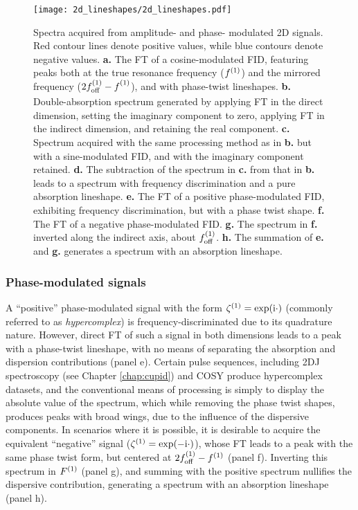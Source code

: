 \begin{figure}
    \centering
    \texttt{[image: 2d\_lineshapes/2d\_lineshapes.pdf]}
    \caption[
        Spectra acquired from amplitude- and phase-modulated \acs{2D} signals.
    ]{
        Spectra acquired from amplitude- and phase- modulated \acs{2D} signals.
        Red contour lines denote positive values, while blue contours denote
        negative values.
        \textbf{a.} The \ac{FT} of a cosine-modulated \ac{FID}, featuring peaks
        both at the true resonance frequency ($f^{(1)}$) and the mirrored
        frequency ($2f_{\mathrm{off}}^{(1)} - f^{(1)}_{\vphantom{off}}$), and with phase-twist lineshapes.
        \textbf{b.} Double-absorption spectrum generated by applying \ac{FT}
        in the direct dimension, setting the imaginary component to zero,
        applying \ac{FT} in the indirect dimension, and retaining the real
        component.
        \textbf{c.} Spectrum acquired with the same processing method as in
        \textbf{b.} but with a sine-modulated \ac{FID}, and with the imaginary
        component retained.
        \textbf{d.} The subtraction of the spectrum in \textbf{c.} from that in
        \textbf{b.} leads to a spectrum with frequency discrimination and a
        pure absorption lineshape.
        \textbf{e.} The \ac{FT} of a positive phase-modulated \ac{FID},
        exhibiting frequency discrimination, but with a phase twist shape.
        \textbf{f.} The \ac{FT} of a negative phase-modulated \ac{FID}.
        \textbf{g.} The spectrum in \textbf{f.} inverted along the indirect
        axis, about $f_{\mathrm{off}}^{(1)}$.
        \textbf{h.} The summation of \textbf{e.} and \textbf{g.} generates a
        spectrum with an absorption lineshape.
    }
    \label{fig:2d-lineshapes}
\end{figure}

\subsubsection{Phase-modulated signals}

A ``positive'' phase-modulated signal with the form $\zeta^{(1)} = \exp(\mathrm{i} \cdot)$
(commonly referred to as \emph{hypercomplex}) is frequency-discriminated due to
its quadrature nature. However, direct \ac{FT} of such a signal in both
dimensions leads to a peak with a phase-twist lineshape, with no means of
separating the absorption and dispersion contributions (panel e). Certain pulse
sequences, including \ac{2DJ} spectroscopy\cite{Aue1976,Morris2009} (see
Chapter \ref{chap:cupid}) and
\ac{COSY}\cite{Jeener1971,Jeener2016,Aue1976a} produce hypercomplex datasets,
and the conventional means of processing is simply to display the absolute
value of the spectrum, which while removing the phase twist shapes, produces
peaks with broad wings, due to the influence of the dispersive components. In
scenarios where it is possible, it is desirable to acquire the equivalent
``negative'' signal ($\zeta^{(1)} = \exp(-\mathrm{i} \cdot)$), whose \ac{FT} leads to
a peak with the same phase twist form, but centered at $2f_{\mathrm{off}}^{(1)} - f^{(1)}$
(panel f). Inverting this spectrum in $F^{(1)}$ (panel g), and summing with the
positive spectrum nullifies the dispersive contribution, generating a spectrum
with an absorption lineshape\cite{Davis1992} (panel h).


